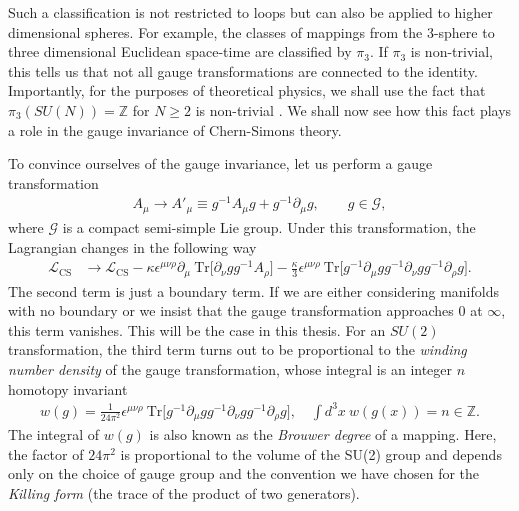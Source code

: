     Such a classification is not restricted to loops but can also be applied to higher dimensional spheres. For example, the classes of mappings from the 3-sphere to three dimensional Euclidean space-time are classified by $\pi_3$. If $\pi_3$ is non-trivial, this tells us that not all gauge transformations are connected to the identity. Importantly, for the purposes of theoretical physics, we shall use the fact that $\pi_3\left(SU(N) \right)=\mathbb{Z}$ for $N\geq2$ is non-trivial \cite{Toda1959}. We shall now see how this fact plays a role in the gauge invariance of Chern-Simons theory.

    To convince ourselves of the gauge invariance, let us perform a gauge transformation
    \begin{align}
        A_{\mu} \rightarrow A'_{\mu} \equiv g^{-1} A_{\mu} g + g^{-1}\partial_{\mu} g, \qquad g\in \mathcal{G},
    \end{align}
    where $\mathcal{G}$ is a compact semi-simple Lie group.
    Under this transformation, the Lagrangian changes in the following way
    \begin{align}
        \mathcal{L}_{\text{CS}} &\rightarrow \mathcal{L}_{\text{CS}}  - \kappa \epsilon^{\mu \nu \rho} \partial_{\mu} \ \mathrm{Tr} \bigg[\partial_{\nu} g g^{-1} A_{\rho}  \bigg] - \frac{\kappa}{3} \epsilon^{\mu \nu \rho} \ \mathrm{Tr} \bigg[g^{-1} \partial_{\mu} g g^{-1} \partial_{\nu} g g^{-1} \partial_{\rho} g\bigg].
    \end{align}
    The second term is just a boundary term. If we are either considering manifolds with no boundary or we insist that the gauge transformation approaches $0$ at $\infty$, this term vanishes. This will be the case in this thesis. For an $SU(2)$ transformation, the third term turns out to be proportional to the \textit{winding number density} of the gauge transformation, whose integral is an integer $n$ homotopy invariant
    \begin{align}
        w(g) = \frac{1}{24 \pi^2} \epsilon^{\mu \nu \rho} \ \mathrm{Tr} \bigg[g^{-1}\partial_{\mu} g g^{-1} \partial_{\nu} g g^{-1} \partial_{\rho} g \bigg], \quad \int d^3x \ w(g(x)) = n \in \mathbb{Z}.
    \end{align}
    The integral of $w(g)$ is also known as the \textit{Brouwer degree} of a mapping. Here, the factor of $24\pi^2$ is proportional to the volume of the SU(2) group and depends only on the choice of gauge group and the convention we have chosen for the \textit{Killing form} (the trace of the product of two generators). 

